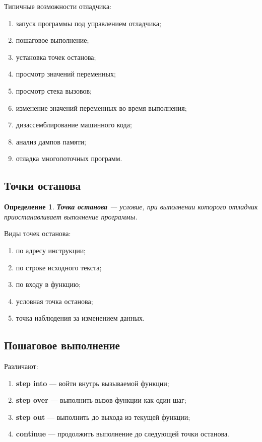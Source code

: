 \documentclass[12pt,a4paper]{article}
\newtheorem{definition}{Определение}
\begin{document}
Типичные возможности отладчика:
\begin{enumerate}
  \item запуск программы под управлением отладчика;
  \item пошаговое выполнение;
  \item установка точек останова;
  \item просмотр значений переменных;
  \item просмотр стека вызовов;
  \item изменение значений переменных во время выполнения;
  \item дизассемблирование машинного кода;
  \item анализ дампов памяти;
  \item отладка многопоточных программ.
\end{enumerate}

\subsection{Точки останова}

\begin{definition}
\textbf{Точка останова} --- условие, при выполнении которого отладчик приостанавливает выполнение программы.
\end{definition}

Виды точек останова:
\begin{enumerate}
  \item по адресу инструкции;
  \item по строке исходного текста;
  \item по входу в функцию;
  \item условная точка останова;
  \item точка наблюдения за изменением данных.
\end{enumerate}

\subsection{Пошаговое выполнение}

Различают:
\begin{enumerate}
  \item \textbf{step into} --- войти внутрь вызываемой функции;
  \item \textbf{step over} --- выполнить вызов функции как один шаг;
  \item \textbf{step out} --- выполнить до выхода из текущей функции;
  \item \textbf{continue} --- продолжить выполнение до следующей точки останова.
\end{enumerate}
\end{document}
